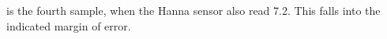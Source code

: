 is the fourth sample, when the Hanna sensor also read 7.2. This falls into the indicated margin of error.